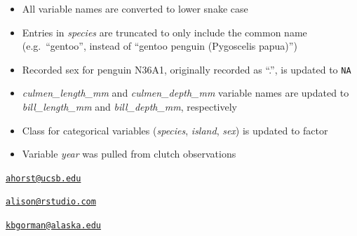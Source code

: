 \begin{itemize}
\tightlist
\item
  All variable names are converted to lower snake case
\item
  Entries in \emph{species} are truncated to only include the common
  name (e.g.~``gentoo'', instead of ``gentoo penguin (Pygoscelis
  papua)'')
\item
  Recorded sex for penguin N36A1, originally recorded as ``.'', is
  updated to \texttt{NA}
\item
  \emph{culmen\_length\_mm} and \emph{culmen\_depth\_mm} variable names
  are updated to \emph{bill\_length\_mm} and \emph{bill\_depth\_mm},
  respectively
\item
  Class for categorical variables (\emph{species}, \emph{island},
  \emph{sex}) is updated to factor
\item
  Variable \emph{year} was pulled from clutch observations
\end{itemize}




\address{%
Allison M. Horst\\
Bren School of Environmental Science and Management\\
University of California, Santa Barbara\\ Santa Barbara, CA 93106-5131\\
}
\href{mailto:ahorst@ucsb.edu}{\nolinkurl{ahorst@ucsb.edu}}

\address{%
Alison P. Hill\\
RStudio, PBC\\
250 Northern Ave\\ Boston, MA 02210\\
}
\href{mailto:alison@rstudio.com}{\nolinkurl{alison@rstudio.com}}

\address{%
Kristen B. Gorman\\
University of Alaska Fairbanks College of Fisheries and Ocean Sciences\\
2150 Koyukuk Drive\\ 245 O'Neill Building\\ Fairbanks, AK 99775-7220\\
}
\href{mailto:kbgorman@alaska.edu}{\nolinkurl{kbgorman@alaska.edu}}

